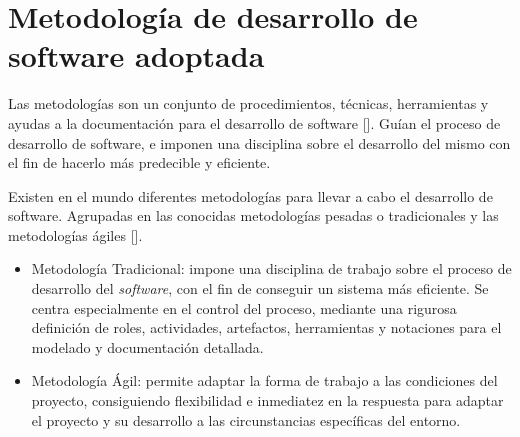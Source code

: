 %
%

\section{Metodología de desarrollo de software adoptada}
Las metodologías son un conjunto de procedimientos, técnicas, herramientas y ayudas a la documentación para el desarrollo de software [\cite{91}]. Guían el proceso de desarrollo de software, e imponen una disciplina sobre el desarrollo del mismo con el fin de hacerlo más predecible y eficiente.

Existen en el mundo diferentes metodologías para llevar a cabo el desarrollo de software. Agrupadas en las conocidas metodologías pesadas o tradicionales y las metodologías ágiles [\cite{92}].

\begin{itemize}
\item Metodología Tradicional: impone una disciplina de trabajo sobre el proceso de desarrollo del \textit{software}, con el fin de conseguir un sistema más eficiente. Se centra especialmente en el control del proceso, mediante una rigurosa definición de roles, actividades, artefactos, herramientas y notaciones para el modelado y documentación detallada.
\item Metodología Ágil: permite adaptar la forma de trabajo a las condiciones del proyecto, consiguiendo flexibilidad e inmediatez en la respuesta para adaptar el proyecto y su desarrollo a las circunstancias específicas del entorno.
\end{itemize}

